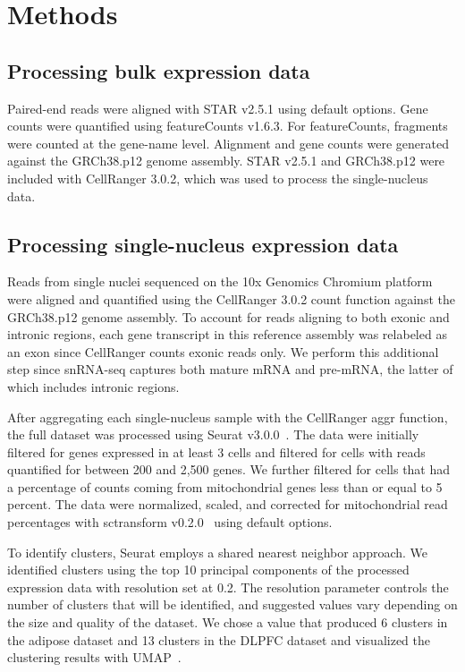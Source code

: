 \section{Methods}

\subsection{Processing bulk expression data}

Paired-end reads were aligned with STAR v2.5.1 using default options.  Gene counts were quantified using featureCounts v1.6.3. For featureCounts, fragments were counted at the gene-name level. Alignment and gene counts were generated against the GRCh38.p12 genome assembly. STAR v2.5.1 and GRCh38.p12 were included with CellRanger 3.0.2, which was used to process the single-nucleus data.

\subsection{Processing single-nucleus expression data}

Reads from single nuclei sequenced on the 10x Genomics Chromium platform were aligned and quantified using the CellRanger 3.0.2 count function against the GRCh38.p12 genome assembly. To account for reads aligning to both exonic and intronic regions, each gene transcript in this reference assembly was relabeled as an exon since CellRanger counts exonic reads only. We perform this additional step since snRNA-seq captures both mature mRNA and pre-mRNA, the latter of which includes intronic regions. 

After aggregating each single-nucleus sample with the CellRanger aggr function, the full dataset was processed using Seurat v3.0.0~\cite{Butler2018-mj}. The data were initially filtered for genes expressed in at least 3 cells and filtered for cells with reads quantified for between 200 and 2,500 genes. We further filtered for cells that had a percentage of counts coming from mitochondrial genes less than or equal to 5 percent. The data were normalized, scaled, and corrected for mitochondrial read percentages with sctransform v0.2.0~\cite{Hafemeister_undated-xh} using default options.

To identify clusters, Seurat employs a shared nearest neighbor approach. We identified clusters using the top 10 principal components of the processed expression data with resolution set at 0.2. The resolution parameter controls the number of clusters that will be identified, and suggested values vary depending on the size and quality of the dataset. We chose a value that produced 6 clusters in the adipose dataset and 13 clusters in the DLPFC dataset and visualized the clustering results with UMAP~\cite{McInnes2018-lp}. 

